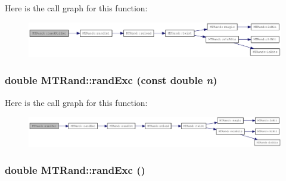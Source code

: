 Here is the call graph for this function:\nopagebreak
\begin{figure}[H]
\begin{center}
\leavevmode
\includegraphics[width=417pt]{classMTRand_a4d3a475aa72fe6d1a6d7d9e16d6a732e_cgraph}
\end{center}
\end{figure}
\hypertarget{classMTRand_aa1e89d6c7ac8737567b3ccf8fe70b6de}{
\subsubsection[{randExc}]{\setlength{\rightskip}{0pt plus 5cm}double MTRand::randExc (const double {\em n})}}
\label{classMTRand_aa1e89d6c7ac8737567b3ccf8fe70b6de}


Here is the call graph for this function:\nopagebreak
\begin{figure}[H]
\begin{center}
\leavevmode
\includegraphics[width=420pt]{classMTRand_aa1e89d6c7ac8737567b3ccf8fe70b6de_cgraph}
\end{center}
\end{figure}
\hypertarget{classMTRand_afd05e468983b3a3d66ce0f403bd666af}{
\subsubsection[{randExc}]{\setlength{\rightskip}{0pt plus 5cm}double MTRand::randExc ()}}
\label{classMTRand_afd05e468983b3a3d66ce0f403bd666af}


